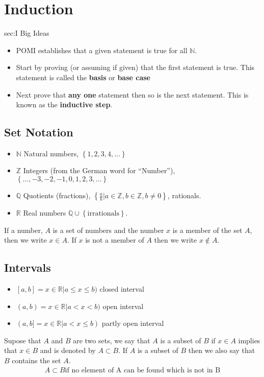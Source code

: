 \chapter{Induction}
\label{chap:I}

\begin{bigideas}{sec:I Big Ideas}
\begin{itemize}
  \item POMI establishes that a given statement is true for all $\mathbb{N}$.
  \item Start by proving (or assuming if given) that the first statement is true. This statement is called the \textbf{basis} or \textbf{base case}
  \item Next prove that \textbf{any one} statement then so is the next statement. This is known as the \textbf{inductive step}.
\end{itemize}
\end{bigideas}

\section{Set Notation}
\begin{itemize}
  \item $\mathbb{N}$ Natural numbers, $\left\{ 1,2,3,4,\ldots\right\}$
  \item $\mathbb{Z}$ Integers (from the German word for ``Number''), $\left\{\ldots,-3,-2,-1,0,1,2,3,\ldots\right\}$
  \item $\mathbb{Q}$ Quotients (fractions), $\left\{ \frac{a}{b} | a \in \mathbb{Z}, b \in \mathbb{Z}, b \neq 0 \right\}$, rationals.
  \item $\mathbb{R}$ Real numbers $\mathbb{Q} \cup \left\{\text{irrationals}\right\}$.
\end{itemize}
If a number, $A$ is a set of numbers and the number $x$ is a member of the set
$A$, then we write $x \in A$. If $x$ is not a member of $A$ then we write
$x \notin A$.

\section{Intervals}
\begin{itemize}
  \item $[a,b] = {x \in \mathbb{R} | a \leq x \leq b})$ closed interval
  \item $(a,b) = {x \in \mathbb{R} | a < x < b})$ open interval
  \item $(a,b] = {x \in \mathbb{R} | a < x \leq b})$ partly open interval
\end{itemize}
Supose that $A$ and $B$ are two sets, we say that $A$ is a subset of $B$ if $x \in A$
implies that $x \in B$ and is denoted by $A \subset B$. If $A$ is a subset of $B$
then we also say that $B$ contains the set $A$.
\begin{align}
  A \subset B \text{if no element of A can be found which is not in B} \nonumber
\end{align}
